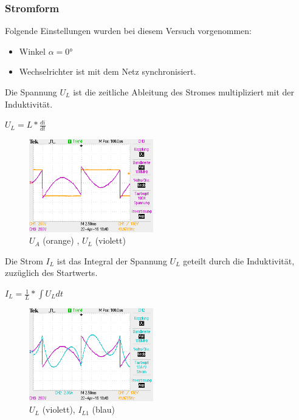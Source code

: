 \subsubsection{Stromform}
Folgende Einstellungen wurden bei diesem Versuch vorgenommen:
\begin{itemize}
\item Winkel $\alpha = 0°$
\item Wechselrichter ist mit dem Netz synchronisiert.
\end{itemize}

Die Spannung $U_L$ ist die zeitliche Ableitung des Stromes multipliziert mit der Induktivität.
\begin{center}
$U_L = L * \frac{di}{dt}$
\end{center}

\begin{figure}[H]
  \begin{center}
  \includegraphics[width=0.48\textwidth]
  {pic/6_1_grundfrequenztaktung/6_1_1_stromform/ALL0001/F0001TEK.png}
  \caption{$U_A$ (orange) , $U_L$ (violett)}
  \label{fig:6_1_1_1}
  \end{center}
\end{figure}


Die Strom $I_L$ ist das Integral der Spannung $U_L$ geteilt durch die Induktivität, zuzüglich des Startwerts.
\begin{center}
$I_L = \frac{1}{L} * \int U_L dt$
\end{center}
\begin{figure}[H]
  \begin{center}
  \includegraphics[width=0.48\textwidth]
  {pic/6_1_grundfrequenztaktung/6_1_1_stromform/ALL0002/F0002TEK.png}
  \caption{$U_L$ (violett), $I_{L1}$ (blau)}
  \label{fig:6_1_1_2}
  \end{center}
\end{figure}

